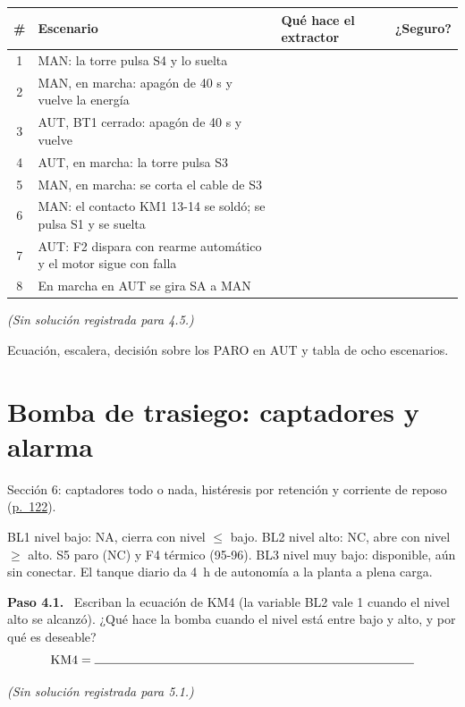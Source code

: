 \documentclass[11pt,a4paper]{article}
\makeatletter
\newif\ifdocente
\newcommand{\solucion}[1]{%
  \ifdocente
    \ifcsname sol@#1\endcsname
      \begin{solucionbox}\small\csname sol@#1\endcsname\end{solucionbox}%
    \else
      \begin{solucionbox}\small\textit{(Sin solución registrada para #1.)}\end{solucionbox}%
    \fi
  \fi}
\newcommand{\cv}[1]{\mathrm{#1}}
\newcommand{\paso}[1]{\par\needspace{4\baselineskip}\noindent\textbf{\color{navy}Paso #1.}\ }
\newcommand{\pdfpag}[1]{\href{https://github.com/marcoteran/atsep-energy-control-labs/raw/refs/heads/master/presentaciones/marcoteran_energy_electriccontroland_wiredlogyc.pdf\#page=#1}{p.~#1}}
\makeatother
\begin{document}
\begin{center}\small\renewcommand{\arraystretch}{1.5}
\begin{tabularx}{\linewidth}{@{}c p{6.1cm} W p{1.4cm}@{}}
\toprule
\textbf{\#} & \textbf{Escenario} & \textbf{Qué hace el extractor} & \textbf{¿Seguro?}\\
 & MAN: la torre pulsa S4 y lo suelta & & \\
2 & MAN, en marcha: apagón de 40 s y vuelve la energía & & \\
3 & AUT, BT1 cerrado: apagón de 40 s y vuelve & & \\
4 & AUT, en marcha: la torre pulsa S3 & & \\
5 & MAN, en marcha: se corta el cable de S3 & & \\
6 & MAN: el contacto KM1 13-14 se soldó; se pulsa S1 y se suelta & & \\
7 & AUT: F2 dispara con rearme automático y el motor sigue con falla & & \\
8 & En marcha en AUT se gira SA a MAN & & \\
\bottomrule
\end{tabularx}
\end{center}
\solucion{4.5}

\begin{evidencia}
Ecuación, escalera, decisión sobre los PARO en AUT y tabla de ocho escenarios.
\end{evidencia}

\section{Bomba de trasiego: captadores y alarma}

\begin{curso}
Sección 6: captadores todo o nada, histéresis por retención y corriente de reposo (\pdfpag{122}).
\end{curso}

\begin{datos}
BL1 nivel bajo: NA, cierra con nivel $\le$ bajo. BL2 nivel alto: NC, abre con nivel $\ge$ alto. S5 paro (NC) y F4 térmico (95-96). BL3 nivel muy bajo: disponible, aún sin conectar. El tanque diario da \SI{4}{h} de autonomía a la planta a plena carga.
\end{datos}

\paso{4.1} Escriban la ecuación de KM4 (la variable BL2 vale 1 cuando el nivel alto se alcanzó). ¿Qué hace la bomba cuando el nivel está entre bajo y alto, y por qué es deseable?
\[
\cv{KM4} = \rule{9cm}{0.4pt}
\]
\solucion{5.1}
\end{document}
